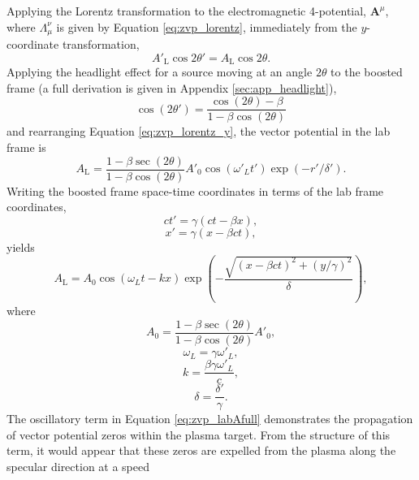 Applying the Lorentz transformation to the electromagnetic 4-potential, $\mathbf{A}^\mu$, where $\Lambda_\mu^\nu$ is given by Equation \ref{eq:zvp_lorentz}, immediately from the $y$-coordinate transformation,
\begin{equation}\label{eq:zvp_lorentz_y}
	A'_\mathrm{L}\cos{2\theta'} = A_\mathrm{L}\cos{2\theta}.
\end{equation}
Applying the headlight effect for a source moving at an angle $2\theta$ to the boosted frame (a full derivation is given in Appendix \ref{sec:app_headlight}),
\begin{equation}
	\cos{(2\theta')} = \frac{\cos{(2\theta)}-\beta}{1 - \beta\cos{(2\theta)}}
\end{equation}
and rearranging Equation \ref{eq:zvp_lorentz_y}, the vector potential in the lab frame is
\begin{equation}\label{eq:zvp_labA}
	A_\mathrm{L} = \frac{1-\beta \sec{(2\theta)}}{1 - \beta\cos{(2\theta)}} A'_0\cos{(\omega'_L t')}\exp{(-r'/\delta')}.
\end{equation}
Writing the boosted frame space-time coordinates in terms of the lab frame coordinates,
\begin{equation}
	ct' = \gamma(ct-\beta x),
\end{equation}
\begin{equation}
	x' = \gamma(x-\beta ct),
\end{equation}
yields
\begin{equation}\label{eq:zvp_labAfull}
	A_\mathrm{L} =  A_0\cos{(\omega_L t - kx)}\exp{\left(-\frac{\sqrt{(x-\beta ct)^2+(y/\gamma)^2}}{\delta}\right)},
\end{equation}
where
\begin{equation}
	A_0 = \frac{1-\beta \sec{(2\theta)}}{1 - \beta\cos{(2\theta)}}A'_0,
\end{equation}
\begin{equation}
	\omega_L = \gamma \omega'_L,
\end{equation}
\begin{equation}
	k = \frac{\beta \gamma\omega'_L}{c},
\end{equation}
\begin{equation}
	\delta = \frac{\delta'}{\gamma}.
\end{equation}
The oscillatory term in Equation \ref{eq:zvp_labAfull} demonstrates the propagation of vector potential zeros within the plasma target. From the structure of this term, it would appear that these zeros are expelled from the plasma along the specular direction at a speed
